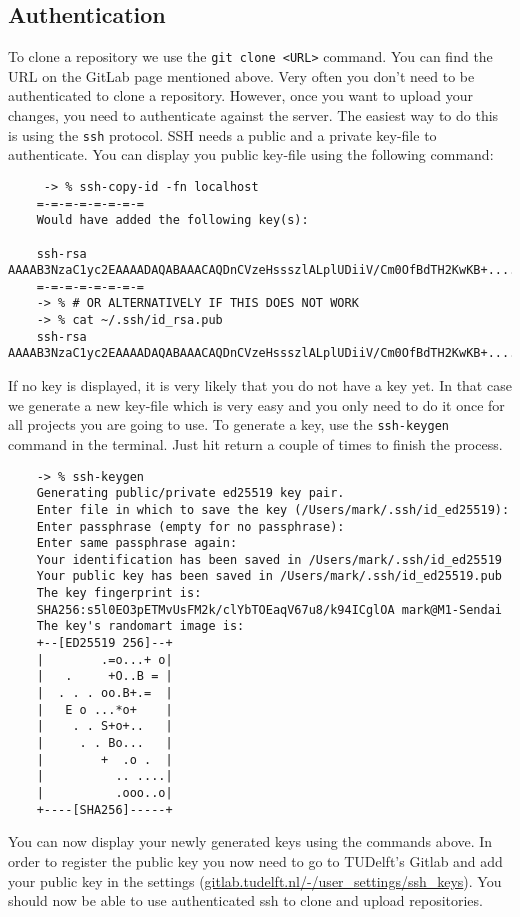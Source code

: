 \documentclass[12pt]{article}
\begin{document}
\subsection{Authentication}
To clone a repository we use the \texttt{git clone <URL>} command.
You can find the URL on the GitLab page mentioned above.
Very often you don't need to be authenticated to clone a repository.
However, once you want to upload your changes, you need to authenticate
against the server.
The easiest way to do this is using the \texttt{ssh} protocol.
SSH needs a public and a private key-file to authenticate.
You can display you public key-file using the following command:
    \begin{verbatim}
     -> % ssh-copy-id -fn localhost
    =-=-=-=-=-=-=-=
    Would have added the following key(s):
    
    ssh-rsa AAAAB3NzaC1yc2EAAAADAQABAAACAQDnCVzeHssszlALplUDiiV/Cm0OfBdTH2KwKB+.....
    =-=-=-=-=-=-=-=
    -> % # OR ALTERNATIVELY IF THIS DOES NOT WORK
    -> % cat ~/.ssh/id_rsa.pub
    ssh-rsa AAAAB3NzaC1yc2EAAAADAQABAAACAQDnCVzeHssszlALplUDiiV/Cm0OfBdTH2KwKB+.....
    \end{verbatim}
If no key is displayed,
it is very likely that you do not have a key yet.
In that case we generate a new key-file
which is very easy and you only need to do it once
for all projects you are going to use.
To generate a key, use the \texttt{ssh-keygen} command in the terminal.
Just hit return a couple of times to finish the process.
    \begin{verbatim}
    -> % ssh-keygen
    Generating public/private ed25519 key pair.
    Enter file in which to save the key (/Users/mark/.ssh/id_ed25519):
    Enter passphrase (empty for no passphrase):
    Enter same passphrase again:
    Your identification has been saved in /Users/mark/.ssh/id_ed25519
    Your public key has been saved in /Users/mark/.ssh/id_ed25519.pub
    The key fingerprint is:
    SHA256:s5l0EO3pETMvUsFM2k/clYbTOEaqV67u8/k94ICglOA mark@M1-Sendai
    The key's randomart image is:
    +--[ED25519 256]--+
    |        .=o...+ o|
    |   .     +O..B = |
    |  . . . oo.B+.=  |
    |   E o ...*o+    |
    |    . . S+o+..   |
    |     . . Bo...   |
    |        +  .o .  |
    |          .. ....|
    |          .ooo..o|
    +----[SHA256]-----+
    \end{verbatim}

You can now display your newly generated keys using the commands above.
In order to register the public key you now need to go to TUDelft's Gitlab
and add your public key in the settings (\href{https://gitlab.tudelft.nl/-/user_settings/ssh_keys}{gitlab.tudelft.nl/-/user\_settings/ssh\_keys}).
You should now be able to use authenticated ssh to clone and upload repositories.
\end{document}
